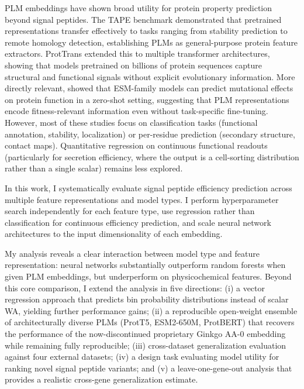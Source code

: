 \documentclass[12pt]{article}
\begin{document}
PLM embeddings have shown broad utility for protein property prediction beyond signal peptides.
The TAPE benchmark \citep{rao2019} demonstrated that pretrained representations transfer effectively to tasks ranging from stability prediction to remote homology detection, establishing PLMs as general-purpose protein feature extractors.
ProtTrans \citep{elnaggar2022} extended this to multiple transformer architectures, showing that models pretrained on billions of protein sequences capture structural and functional signals without explicit evolutionary information.
More directly relevant, \citet{meier2021} showed that ESM-family models can predict mutational effects on protein function in a zero-shot setting, suggesting that PLM representations encode fitness-relevant information even without task-specific fine-tuning.
However, most of these studies focus on classification tasks (functional annotation, stability, localization) or per-residue prediction (secondary structure, contact maps).
Quantitative regression on continuous functional readouts (particularly for secretion efficiency, where the output is a cell-sorting distribution rather than a single scalar) remains less explored.

In this work, I systematically evaluate signal peptide efficiency prediction across multiple feature representations and model types.
I perform hyperparameter search independently for each feature type, use regression rather than classification for continuous efficiency prediction, and scale neural network architectures to the input dimensionality of each embedding.

My analysis reveals a clear interaction between model type and feature representation: neural networks substantially outperform random forests when given PLM embeddings, but underperform on physicochemical features.
Beyond this core comparison, I extend the analysis in five directions: (i) a vector regression approach that predicts bin probability distributions instead of scalar WA, yielding further performance gains; (ii) a reproducible open-weight ensemble of architecturally diverse PLMs (ProtT5, ESM2-650M, ProtBERT) that recovers the performance of the now-discontinued proprietary Ginkgo AA-0 embedding while remaining fully reproducible; (iii) cross-dataset generalization evaluation against four external datasets; (iv) a design task evaluating model utility for ranking novel signal peptide variants; and (v) a leave-one-gene-out analysis that provides a realistic cross-gene generalization estimate.
\end{document}
